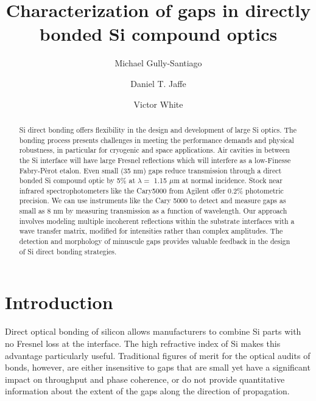 \documentclass[osajnl,preprint,showpacs,superscriptaddress,12pt]{revtex4-1} %
\begin{document}
\title{Characterization of gaps in directly bonded Si compound optics}

\author{Michael Gully-Santiago}
\author{Daniel T. Jaffe}

\author{Victor White}


\begin{abstract}
Si direct bonding offers flexibility in the design and development of large Si optics.  The bonding process presents challenges in meeting the performance demands and physical robustness, in particular for cryogenic and space applications.  Air cavities in between the Si interface will have large Fresnel reflections which will interfere as a low-Finesse Fabry-P\`erot etalon.  Even small (35 nm) gaps reduce transmission through a direct bonded Si compound optic by 5\% at $\lambda = $ 1.15 $\mu$m at normal incidence.  Stock near infrared spectrophotometers like the Cary5000 from Agilent offer 0.2\% photometric precision.  We can use instruments like the Cary 5000 to detect and measure gaps as small as 8 nm by measuring transmission as a function of wavelength.  Our approach involves modeling multiple incoherent reflections within the substrate interfaces with a wave transfer matrix, modified for intensities rather than complex amplitudes.  The detection and morphology of minuscule gaps provides valuable feedback in the design of Si direct bonding strategies.
\end{abstract}


\maketitle %

\section{Introduction}


Direct optical bonding of silicon allows manufacturers to combine Si parts with no Fresnel loss at the interface.  The high refractive index of Si makes this advantage particularly useful.  Traditional figures of merit for the optical audits of bonds, however, are either insensitive to gaps that are small yet have a significant impact on throughput and phase coherence, or do not provide quantitative information about the extent of the gaps along the direction of propagation.
\end{document}
